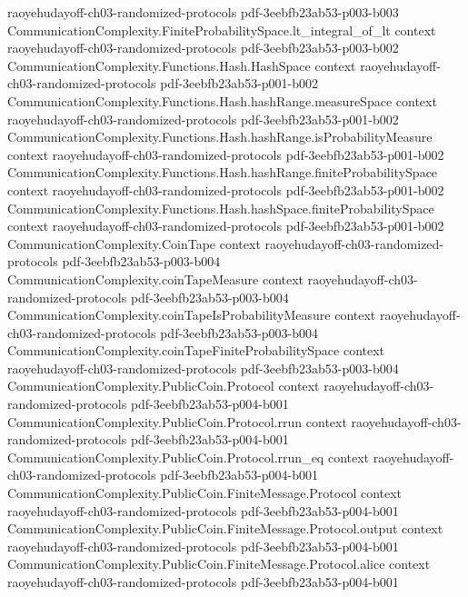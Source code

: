 \begin{theorem}
  {raoyehudayoff-ch03-randomized-protocols}
  {pdf-3eebfb23ab53-p003-b003}
\proofstep
  {CommunicationComplexity.FiniteProbabilitySpace.lt_integral_of_lt}
  {context}
  {raoyehudayoff-ch03-randomized-protocols}
  {pdf-3eebfb23ab53-p003-b002}
\proofstep
  {CommunicationComplexity.Functions.Hash.HashSpace}
  {context}
  {raoyehudayoff-ch03-randomized-protocols}
  {pdf-3eebfb23ab53-p001-b002}
\proofstep
  {CommunicationComplexity.Functions.Hash.hashRange.measureSpace}
  {context}
  {raoyehudayoff-ch03-randomized-protocols}
  {pdf-3eebfb23ab53-p001-b002}
\proofstep
  {CommunicationComplexity.Functions.Hash.hashRange.isProbabilityMeasure}
  {context}
  {raoyehudayoff-ch03-randomized-protocols}
  {pdf-3eebfb23ab53-p001-b002}
\proofstep
  {CommunicationComplexity.Functions.Hash.hashRange.finiteProbabilitySpace}
  {context}
  {raoyehudayoff-ch03-randomized-protocols}
  {pdf-3eebfb23ab53-p001-b002}
\proofstep
  {CommunicationComplexity.Functions.Hash.hashSpace.finiteProbabilitySpace}
  {context}
  {raoyehudayoff-ch03-randomized-protocols}
  {pdf-3eebfb23ab53-p001-b002}
\proofstep
  {CommunicationComplexity.CoinTape}
  {context}
  {raoyehudayoff-ch03-randomized-protocols}
  {pdf-3eebfb23ab53-p003-b004}
\proofstep
  {CommunicationComplexity.coinTapeMeasure}
  {context}
  {raoyehudayoff-ch03-randomized-protocols}
  {pdf-3eebfb23ab53-p003-b004}
\proofstep
  {CommunicationComplexity.coinTapeIsProbabilityMeasure}
  {context}
  {raoyehudayoff-ch03-randomized-protocols}
  {pdf-3eebfb23ab53-p003-b004}
\proofstep
  {CommunicationComplexity.coinTapeFiniteProbabilitySpace}
  {context}
  {raoyehudayoff-ch03-randomized-protocols}
  {pdf-3eebfb23ab53-p003-b004}
\proofstep
  {CommunicationComplexity.PublicCoin.Protocol}
  {context}
  {raoyehudayoff-ch03-randomized-protocols}
  {pdf-3eebfb23ab53-p004-b001}
\proofstep
  {CommunicationComplexity.PublicCoin.Protocol.rrun}
  {context}
  {raoyehudayoff-ch03-randomized-protocols}
  {pdf-3eebfb23ab53-p004-b001}
\proofstep
  {CommunicationComplexity.PublicCoin.Protocol.rrun_eq}
  {context}
  {raoyehudayoff-ch03-randomized-protocols}
  {pdf-3eebfb23ab53-p004-b001}
\proofstep
  {CommunicationComplexity.PublicCoin.FiniteMessage.Protocol}
  {context}
  {raoyehudayoff-ch03-randomized-protocols}
  {pdf-3eebfb23ab53-p004-b001}
\proofstep
  {CommunicationComplexity.PublicCoin.FiniteMessage.Protocol.output}
  {context}
  {raoyehudayoff-ch03-randomized-protocols}
  {pdf-3eebfb23ab53-p004-b001}
\proofstep
  {CommunicationComplexity.PublicCoin.FiniteMessage.Protocol.alice}
  {context}
  {raoyehudayoff-ch03-randomized-protocols}
  {pdf-3eebfb23ab53-p004-b001}

\end{theorem}
